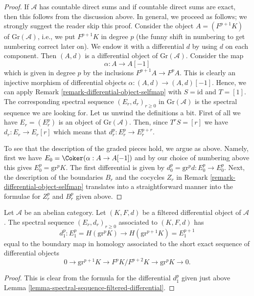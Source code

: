 \begin{proof}
If $\mathcal{A}$ has countable direct sums and if countable direct
sums are exact, then this follows from the discussion above.
In general, we proceed as follows; we strongly suggest the reader
skip this proof. Consider the object $A = (F^{p + 1}K)$ of
$\text{Gr}(\mathcal{A})$, i.e., we put $F^{p + 1}K$ in degree $p$
(the funny shift in numbering to get numbering correct later on).
We endow it with a differential $d$ by using $d$ on each component.
Then $(A, d)$ is a differential object of $\text{Gr}(\mathcal{A})$.
Consider the map
$$
\alpha : A \to A[-1]
$$
which is given in degree $p$ by the inclusions $F^{p + 1}A \to F^pA$.
This is clearly an injective morphism of differential objects
$\alpha : (A, d) \to (A, d)[-1]$. Hence, we can apply
Remark \ref{remark-differential-object-selfmap}
with $S = \text{id}$ and $T = [1]$.
The corresponding spectral sequence $(E_r, d_r)_{r \geq 0}$
in $\text{Gr}(\mathcal{A})$ is the spectral sequence we are looking
for. Let us unwind the definitions a bit.
First of all we have $E_r = (E_r^p)$ is an object of $\text{Gr}(\mathcal{A})$.
Then, since $T^rS = [r]$ we have $d_r : E_r \to E_r[r]$ which means that
$d_r^p : E_r^p \to E_r^{p + r}$.

\medskip\noindent
To see that the description of the graded pieces hold, we argue
as above. Namely, first we have $E_0 = \Coker(\alpha : A \to A[-1])$
and by our choice of numbering above this gives
$E_0^p = \text{gr}^pK$. The first differential is given by
$d_0^p = \text{gr}^pd : E_0^p \to E_0^p$.
Next, the description of the boundaries $B_r$ and the cocycles $Z_r$
in Remark \ref{remark-differential-object-selfmap}
translates into a straightforward manner into the formulae
for $Z_r^p$ and $B_r^p$ given above.
\end{proof}

\begin{lemma}
\label{lemma-spectral-sequence-filtered-differential-d1}
Let $\mathcal{A}$ be an abelian category. Let $(K, F, d)$ be a filtered
differential object of $\mathcal{A}$. The spectral sequence
$(E_r, d_r)_{r \geq 0}$ associated to $(K, F, d)$ has
$$
d_1^p :
E_1^p = H(\text{gr}^pK)
\longrightarrow
H(\text{gr}^{p + 1}K) = E_1^{p + 1}
$$
equal to the boundary map in homology associated to the short
exact sequence of differential objects
$$
0 \to \text{gr}^{p + 1}K \to F^pK/F^{p + 2}K \to \text{gr}^pK \to 0.
$$
\end{lemma}

\begin{proof}
This is clear from the formula for the differential $d_1^p$
given just above Lemma \ref{lemma-spectral-sequence-filtered-differential}.
\end{proof}


